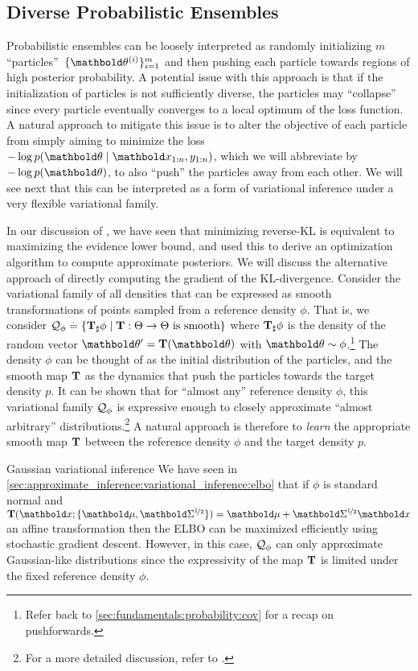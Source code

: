 \subsection{Diverse Probabilistic Ensembles}

Probabilistic ensembles can be loosely interpreted as randomly initializing $m$ ``particles''~$\{\vtheta^{(i)}\}_{i=1}^m$ and then pushing each particle towards regions of high posterior probability.
A potential issue with this approach is that if the initialization of particles is not sufficiently diverse, the particles may ``collapse'' since every particle eventually converges to a local optimum of the loss function.
A natural approach to mitigate this issue is to alter the objective of each particle from simply aiming to minimize the loss $- \log p(\vtheta \mid \vx_{1:n}, y_{1:n})$, which we will abbreviate by $- \log p(\vtheta)$, to also ``push'' the particles away from each other.
We will see next that this can be interpreted as a form of variational inference under a very flexible variational family.

In our discussion of , we have seen that minimizing reverse-KL is equivalent to maximizing the evidence lower bound, and used this to derive an optimization algorithm to compute approximate posteriors.
We will discuss the alternative approach of directly computing the gradient of the KL-divergence.
Consider the variational family of all densities that can be expressed as smooth transformations of points sampled from a reference density $\phi$. That is, we consider $\mathcal{Q}_\phi \overset{.}{=} \{{\mathbf{T}}_\sharp \phi \mid \text{$\mathbf{T} : \Theta \to \Theta$ is smooth}\}$ where ${\mathbf{T}}_\sharp \phi$ is the density of the random vector $\vtheta' = \vT(\vtheta)$ with $\vtheta \sim \phi$.\footnote{Refer back to \cref{sec:fundamentals:probability:cov} for a recap on pushforwards.}
The density $\phi$ can be thought of as the initial distribution of the particles, and the smooth map $\mathbf{T}$ as the dynamics that push the particles towards the target density $p$.
It can be shown that for ``almost any'' reference density $\phi$, this variational family $\mathcal{Q}_\phi$ is expressive enough to closely approximate ``almost arbitrary'' distributions.\footnote{For a more detailed discussion, refer to .}
A natural approach is therefore to \emph{learn} the appropriate smooth map $\mathbf{T}$ between the reference density $\phi$ and the target density $p$.

\begin{ex}{Gaussian variational inference}{}
  We have seen in \cref{sec:approximate_inference:variational_inference:elbo} that if $\phi$ is standard normal and $\vT(\vx; \{\vmu, \msqrt{\mSigma}\}) = \vmu + \msqrt{\mSigma} \vx$ an affine transformation then the ELBO can be maximized efficiently using stochastic gradient descent.
  However, in this case, $\mathcal{Q}_\phi$ can only approximate Gaussian-like distributions since the expressivity of the map $\mathbf{T}$ is limited under the fixed reference density $\phi$.
\end{ex}

